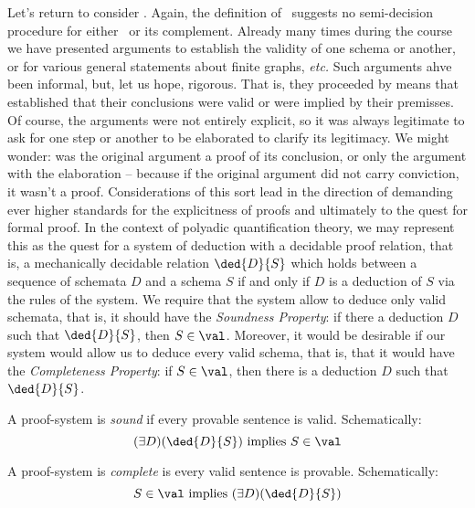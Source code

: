 Let's return to consider \val. Again, the definition of \val\ suggests no semi-decision procedure for either \val\ or its complement. Already many times during the course we have presented arguments to establish the validity of one schema or another, or for various general statements about finite graphs, \emph{etc.} Such arguments ahve been informal, but, let us hope, rigorous. That is, they proceeded by means that established  that their conclusions were valid or were implied by their premisses. Of course, the arguments were not entirely explicit, so it was always legitimate to ask for one step or another to be elaborated to clarify its legitimacy. We might wonder: was the original argument a proof of its conclusion, or only the argument with the elaboration -- because if the original argument did not carry conviction, it wasn't a proof. Considerations of this sort lead in the direction of demanding ever higher standards for the explicitness of proofs and ultimately to the quest for formal proof. In the context of polyadic quantification theory, we may represent this as the quest for a system of deduction with a decidable proof relation, that is, a mechanically decidable relation $\ded{D}{S}$ which holds between a sequence of schemata $D$ and a schema $S$ if and only if $D$ is a deduction of $S$ via the rules of the system. We require that the system allow to deduce only valid schemata, that is, it should have the \emph{Soundness Property}: if there a deduction $D$ such that $\ded{D}{S}$, then $S\in\val$. Moreover, it would be desirable if our system would allow us to deduce every valid schema, that is, that it would have the \emph{Completeness Property}: if $S\in\val$, then there is a deduction $D$ such that $\ded{D}{S}$. 

\begin{definition}
    A proof-system is \emph{sound} if every provable sentence is valid. Schematically:
    \[
        (\exists D)(\ded{D}{S}) \text{ implies } S \in \val
    \]
\end{definition}

\begin{definition}
    A proof-system is \emph{complete} is every valid sentence is provable. Schematically:
    \[
        S \in \val \text{ implies } (\exists D)(\ded{D}{S})
    \]
\end{definition}

